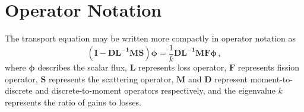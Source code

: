 \section{Operator Notation}
The transport equation may be written more compactly in operator notation as
\begin{equation}
 \mathbf{(I - DL^{-1}MS)} \mathbf{\phi} = \frac{1}{k} \mathbf{DL^{-1}MF} \mathbf{\phi}  \, ,
 \label{eq:keig}
\end{equation}
where $\mathbf{\phi} $ describes the scalar flux, $\mathbf{L}$ represents loss operator,  $\mathbf{F}$ represents fission operator, $\mathbf{S}$ represents the scattering operator, $\mathbf{M}$ and $\mathbf{D}$ represent moment-to-discrete and discrete-to-moment operators respectively, and the eigenvalue $k$ represents the ratio of gains to losses. 